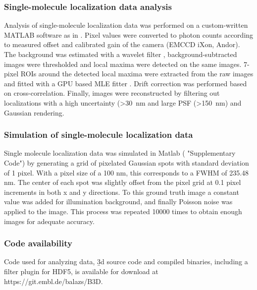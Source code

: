 \subsubsection{Single-molecule localization data analysis}
Analysis of single-molecule localization data was performed on a custom-written MATLAB software as in \cite{deschamps_efficient_2016}. Pixel values were converted to photon counts according to measured offset and calibrated gain of the camera (EMCCD iXon, Andor). The background was estimated with a wavelet filter \cite{izeddin_wavelet_2012}, background-subtracted images were thresholded and local maxima were detected on the same images. 7-pixel ROIs around the detected local maxima were extracted from the raw images and fitted with a GPU based MLE fitter \cite{smith_fast_2010}. Drift correction was performed based on cross-correlation. Finally, images were
reconstructed by filtering out localizations with a high uncertainty (>\SI{30}{nm} and large PSF (>\SI{150}{nm}) and Gaussian rendering.

\subsubsection{Simulation of single-molecule localization data}
Single molecule localization data was simulated in Matlab ( "Supplementary Code") by generating a grid of pixelated Gaussian spots with standard deviation of 1 pixel. With a pixel size of a 100 nm, this corresponds to a FWHM of 235.48 nm. The center of each spot was slightly offset from the pixel grid at 0.1 pixel increments in both x and y directions. To this ground truth image a constant value was added for illumination background, and finally Poisson noise was applied to the image. This process was repeated 10000 times to obtain enough images for adequate accuracy.

\subsubsection{Code availability}
Code used for analyzing data, \b3d source code and compiled binaries, including a filter plugin for HDF5, is available for download at https://git.embl.de/balazs/B3D.
